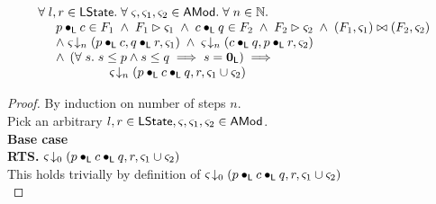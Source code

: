 \begin{lemma}[]\label{lem:amodMerge}
%
\[
\begin{array}{l}
	\forall\; l, r \in \textsf{LState}.\; \forall\; \varsigma_{}, \varsigma_{1}, \varsigma_{2} \in \textsf{AMod}.\; \forall\; n \in \mathbb{N}.\;\\
	\hspace*{0.5cm} p \bullet_{\textsf{L}} c \in F_1 \;\land\; F_1 \rhd \varsigma_{1} \;\land\; c \bullet_{\textsf{L}} q \in F_2 \;\land\; F_2 \rhd \varsigma_{2} \;\land\; (F_1, \varsigma_{1}) \bowtie (F_2, \varsigma_{2})\\
	\hspace*{0.5cm} \land\; \varsigma_{} \!\downarrow_{n} \left(p \bullet_{\textsf{L}} c, q \bullet_{\textsf{L}} r, \varsigma_{1}\right) \;\land\; \varsigma_{} \!\downarrow_{n} \left(c \bullet_{\textsf{L}} q, p \bullet_{\textsf{L}} r, \varsigma_{2}\right) \\
	\hspace*{0.5cm}\land\;\left( \forall\; s.\; s \leq p \land s \leq q \implies s = \mathbf{0}_{\textsf{L}} \right)
	\implies\\
	\hspace*{2cm} \varsigma_{} \!\downarrow_{n} \left(p \bullet_{\textsf{L}} c \bullet_{\textsf{L}} q, r, \varsigma_{1} \cup \varsigma_{2}\right)
\end{array}
\]
%
\begin{proof} By induction on number of steps $n$.\\
\noindent Pick an arbitrary $l, r \in \textsf{LState}, \varsigma_{}, \varsigma_{1}, \varsigma_{2} \in \textsf{AMod}$.\\
\noindent\textbf{Base case}\\
\textbf{RTS. }\hspace*{0.5cm}$\varsigma_{\!}\downarrow_{0} \left(p \bullet_{\textsf{L}} c \bullet_{\textsf{L}} q, r, \varsigma_{1} \cup \varsigma_{2}\right)$\\
This holds trivially by definition of $\varsigma_{\!}\downarrow_{0} \left(p \bullet_{\textsf{L}} c \bullet_{\textsf{L}} q, r, \varsigma_{1} \cup \varsigma_{2}\right)$\\


\end{proof}
\end{lemma}
